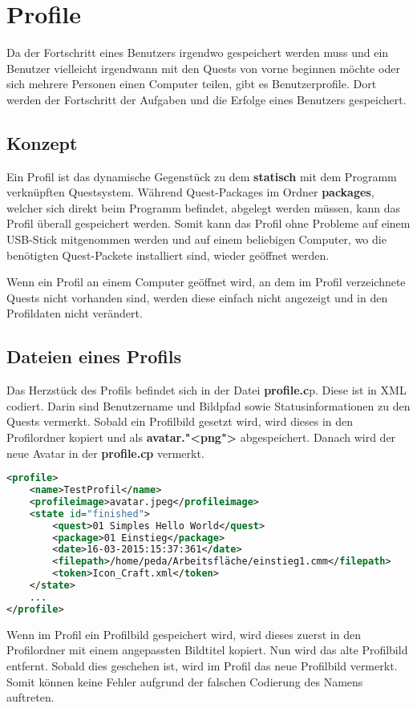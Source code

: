 \section{Profile}
Da der Fortschritt eines Benutzers irgendwo gespeichert werden muss und ein Benutzer vielleicht irgendwann mit den Quests von vorne beginnen möchte oder sich mehrere Personen einen Computer teilen, gibt es Benutzerprofile. Dort werden der Fortschritt der Aufgaben und die Erfolge eines Benutzers gespeichert.

\subsection{Konzept}
Ein Profil ist das dynamische Gegenstück zu dem \textbf{statisch} mit dem Programm verknüpften Questsystem. Während Quest-Packages im Ordner \textbf{packages}, welcher sich direkt beim Programm befindet, abgelegt werden müssen, kann das Profil überall gespeichert werden. Somit kann das Profil ohne Probleme auf einem USB-Stick mitgenommen werden und auf einem beliebigen Computer, wo die benötigten Quest-Packete installiert sind, wieder geöffnet werden.

Wenn ein Profil an einem Computer geöffnet wird, an dem im Profil verzeichnete Quests nicht vorhanden sind, werden diese einfach nicht angezeigt und in den Profildaten nicht verändert.

\subsection{Dateien eines Profils}
Das Herzstück des Profils befindet sich in der Datei \textbf{profile.c}p. Diese ist in XML codiert. Darin sind Benutzername und Bildpfad sowie Statusinformationen zu den Quests vermerkt. Sobald ein Profilbild gesetzt wird, wird dieses in den Profilordner kopiert und als \textbf{avatar."<png">} abgespeichert. Danach wird der neue Avatar in der \textbf{profile.cp} vermerkt.

\begin{lstlisting}[language=XML]
<profile>
	<name>TestProfil</name>
	<profileimage>avatar.jpeg</profileimage>
	<state id="finished">
		<quest>01 Simples Hello World</quest>
		<package>01 Einstieg</package>
		<date>16-03-2015:15:37:361</date>
		<filepath>/home/peda/Arbeitsfläche/einstieg1.cmm</filepath>
		<token>Icon_Craft.xml</token>
	</state>
	...
</profile>
\end{lstlisting}
Wenn im Profil ein Profilbild gespeichert wird, wird dieses zuerst in den Profilordner mit einem angepassten Bildtitel kopiert. Nun wird das alte Profilbild entfernt. Sobald dies geschehen ist, wird im Profil das neue Profilbild vermerkt. Somit können keine Fehler aufgrund der falschen Codierung des Namens auftreten.

